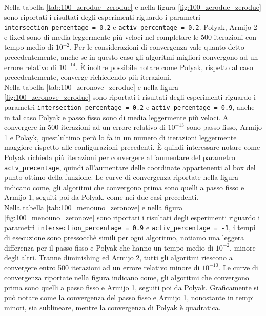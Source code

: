 \documentclass[12pt]{extarticle}
\begin{document}
Nella tabella \ref{tab:100_zerodue_zerodue} e nella figura \ref{fig:100_zerodue_zerodue} sono riportati i risultati degli esperimenti riguardo i parametri \texttt{intersection\_percentage = 0.2} e \texttt{activ\_percentage = 0.2}. Polyak, Armijo 2 e fixed sono di media leggermente più veloci nel completare le 500 iterazioni con tempo medio di $10^{-2}$. Per le considerazioni di convergenza vale quanto detto precedentemente, anche se in questo caso gli algoritmi migliori convergono ad un errore relativo di $10^{-14}$. È inoltre possibile notare come Polyak, rispetto al caso precedentemente, converge richiedendo più iterazioni.\\
Nella tabella \ref{tab:100_zeronove_zerodue}  e nella figura \ref{fig:100_zeronove_zerodue} sono riportati i risultati degli esperimenti riguardo i parametri \texttt{intersection\_percentage = 0.2} e \texttt{activ\_percentage = 0.9}, anche in tal caso Polyak e passo fisso sono di media leggermente più veloci. A convergere in 500 iterazioni ad un errore relativo di $10^{-13}$ sono passo fisso, Armijo 1 e Polayk, quest'ultimo però lo fa in un numero di iterazioni leggermente maggiore rispetto alle configurazioni precedenti. È quindi interessare notare come Polyak richieda più iterazioni per convergere all'aumentare del parametro \texttt{actv\_precentage}, quindi all'aumentare delle coordinate appartenenti al box del punto ottimo della funzione. Le curve di convergenza riportate nella figura indicano come, gli algoritmi che convergono prima sono quelli a passo fisso e Armijo 1, seguiti poi da Polyak,  come nei due casi precedenti.\\
Nella tabella \ref{tab:100_menouno_zeronove} e nella figura \ref{fig:100_menouno_zeronove} sono riportati i risultati degli esperimenti riguardo i parametri \texttt{intersection\_percentage = 0.9} e \texttt{activ\_percentage = -1}, i tempi di esecuzione sono pressocchè simili per ogni algoritmo, notiamo una leggera differenza per il passo fisso e Polyak che hanno un tempo medio di $10^{-2}$, minore degli altri. Tranne diminishing ed Armijo 2, tutti gli algoritmi riescono a convergere entro 500 iterazioni ad un errore relativo minore di $10^{-10}$. Le curve di convergenza riportate nella figura indicano come, gli algoritmi che convergono prima sono quelli a passo fisso e Armijo 1, seguiti poi da Polyak. Graficamente si può notare come la convergenza del passo fisso e Armijo 1, nonostante in tempi minori, sia sublineare, mentre la convergenza di Polyak è quadratica.\\
\end{document}
